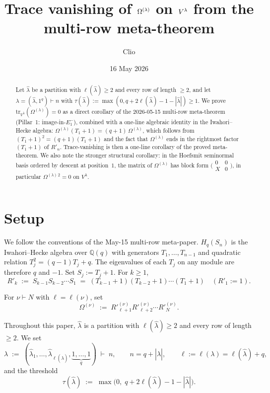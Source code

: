 \documentclass[11pt]{article}
\title{Trace vanishing of $\Om^{(\lambda)}$ on $\Vlam$ from the multi-row meta-theorem}
\author{Clio}
\date{16 May 2026}
\theoremstyle{definition}
\newcommand{\Hq}{H_q}
\newcommand{\Sn}{S_n}
\newcommand{\Vlam}{V^{\lambda}}
\newcommand{\Om}{\Omega}
\newcommand{\hatl}{\widehat\lambda}
\newcommand{\elh}{\ell(\hatl)}
\newcommand{\Rp}{{R'}}
\newcommand{\tr}{\mathrm{tr}}
\begin{document}
\maketitle

\begin{abstract}
Let $\hatl$ be a partition with $\elh \ge 2$ and every row of length
$\ge 2$, and let $\lambda = (\hatl, 1^q) \vdash n$ with
$\tau(\hatl) := \max(0, q + 2\elh - 1 - |\hatl|) \ge 1$.  We prove
$\tr_{\Vlam}(\Om^{(\lambda)}) = 0$ as a direct corollary of the
2026-05-15 multi-row meta-theorem (Pillar~1: image-in-$E^-_1$),
combined with a one-line algebraic identity in the Iwahori--Hecke
algebra: $\Om^{(\lambda)}(T_1+1) = (q+1)\,\Om^{(\lambda)}$, which
follows from $(T_1+1)^2 = (q+1)(T_1+1)$ and the fact that
$\Om^{(\lambda)}$ ends in the rightmost factor $(T_1+1)$ of
$\Rp_n$.  Trace-vanishing is then a one-line corollary of the
proved meta-theorem.  We also note the stronger structural
corollary: in the Hoefsmit seminormal basis ordered by descent at
position~$1$, the matrix of $\Om^{(\lambda)}$ has block form
$\bigl(\begin{smallmatrix}0 & 0\\ X & 0\end{smallmatrix}\bigr)$,
in particular $\Om^{(\lambda)\,2} = 0$ on $\Vlam$.
\end{abstract}

\section{Setup}\label{sec:setup}

We follow the conventions of the May-15 multi-row meta-paper.
$\Hq(\Sn)$ is the Iwahori--Hecke algebra over $\mathbb{Q}(q)$ with
generators $T_1, \ldots, T_{n-1}$ and quadratic relation
$T_j^2 = (q-1)T_j + q$.  The eigenvalues of each $T_j$ on any module
are therefore $q$ and $-1$.  Set $S_j := T_j + 1$.  For $k \ge 1$,
\[
   \Rp_k \;:=\; S_{k-1} S_{k-2} \cdots S_1
   \;=\; (T_{k-1}+1)(T_{k-2}+1)\cdots(T_1+1) \quad (\Rp_1 := 1).
\]

For $\nu \vdash N$ with $\ell = \ell(\nu)$, set
\[
   \Om^{(\nu)} \;:=\; \Rp_{\ell+1}^{(\nu)} \Rp_{\ell+2}^{(\nu)} \cdots
   \Rp_N^{(\nu)}.
\]

Throughout this paper, $\hatl$ is a partition with $\elh \ge 2$ and
every row of length $\ge 2$.  We set
\[
   \lambda \;:=\; (\hatl_1, \ldots, \hatl_{\elh}, \underbrace{1, \ldots, 1}_{q})
   \;\vdash\; n,
   \qquad n = q + |\hatl|,
   \qquad \ell := \ell(\lambda) = \elh + q,
\]
and the threshold
\[
   \tau(\hatl) \;:=\; \max\bigl(0,\; q + 2\elh - 1 - |\hatl|\bigr).
\]
\end{document}
